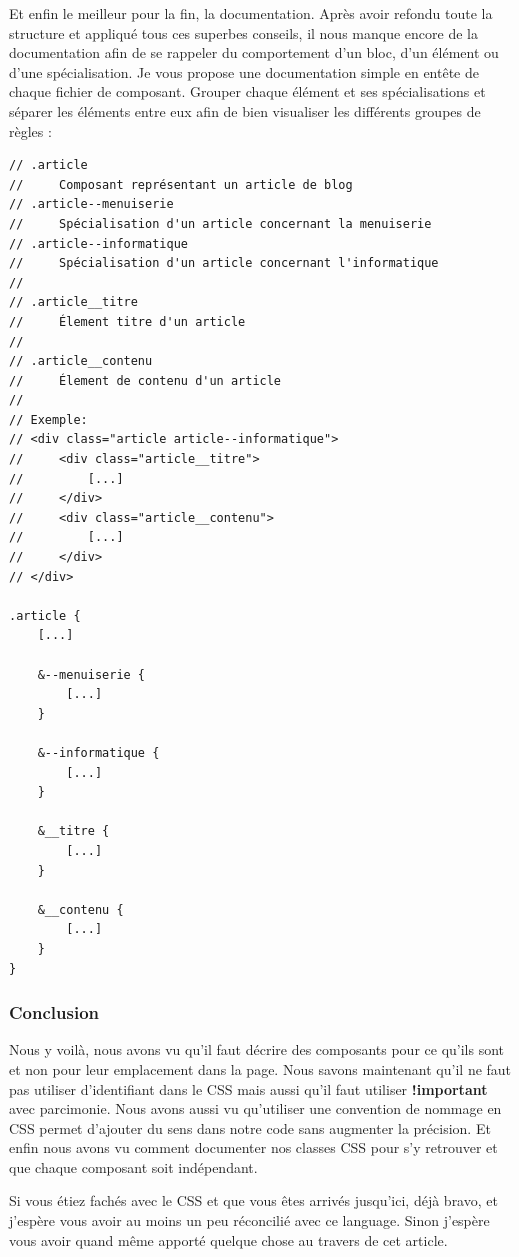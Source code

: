 \documentclass[12pt, a4paper]{report}
\begin{document}
Et enfin le meilleur pour la fin, la documentation.
Après avoir refondu toute la structure et appliqué tous ces superbes conseils, il nous manque encore de la documentation afin de se rappeler du comportement d'un bloc, d'un élément ou d'une spécialisation.
Je vous propose une documentation simple en entête de chaque fichier de composant.
Grouper chaque élément et ses spécialisations et séparer les éléments entre eux afin de bien visualiser les différents groupes de règles :

\begin{lstlisting}
// .article
//     Composant représentant un article de blog
// .article--menuiserie
//     Spécialisation d'un article concernant la menuiserie
// .article--informatique
//     Spécialisation d'un article concernant l'informatique
//
// .article__titre
//     Élement titre d'un article
//
// .article__contenu
//     Élement de contenu d'un article
//
// Exemple:
// <div class="article article--informatique">
//     <div class="article__titre">
//         [...]
//     </div>
//     <div class="article__contenu">
//         [...]
//     </div>
// </div>

.article {
    [...]

    &--menuiserie {
        [...]
    }

    &--informatique {
        [...]
    }

    &__titre {
        [...]
    }

    &__contenu {
        [...]
    }
}
\end{lstlisting}

\subsubsection{Conclusion}

Nous y voilà, nous avons vu qu'il faut décrire des composants pour ce qu'ils sont et non pour leur emplacement dans la page.
Nous savons maintenant qu'il ne faut pas utiliser d'identifiant dans le CSS mais aussi qu'il faut utiliser \textbf{!important} avec parcimonie.
Nous avons aussi vu qu'utiliser une convention de nommage en CSS permet d'ajouter du sens dans notre code sans augmenter la précision.
Et enfin nous avons vu comment documenter nos classes CSS pour s'y retrouver et que chaque composant soit indépendant.

Si vous étiez fachés avec le CSS et que vous êtes arrivés jusqu'ici, déjà bravo, et j'espère vous avoir au moins un peu réconcilié avec ce language.
Sinon j'espère vous avoir quand même apporté quelque chose au travers de cet article.

\listoffigures
\makeutbmbackcover{}
\end{document}
